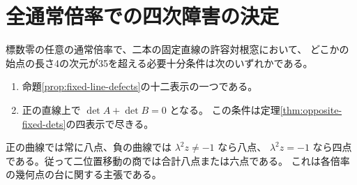 \section{全通常倍率での四次障害の決定}
\label{sec:uniform-fixed-quartic}
\begin{theorem}\label{thm:uniform-fixed-quartic}
標数零の任意の通常倍率で、二本の固定直線の許容対根窓において、
どこかの始点の長さ4の次元が35を超える必要十分条件は次のいずれかである。
\begin{enumerate}
\item 命題\ref{prop:fixed-line-defects}の十二表示の一つである。
\item 正の直線上で $\det A+\det B=0$ となる。
この条件は定理\ref{thm:opposite-fixed-dets}の四表示で尽きる。
\end{enumerate}
正の曲線では常に八点、負の曲線では $\lambda^2z\ne-1$ なら八点、
$\lambda^2z=-1$ なら四点である。従って二位置移動の商では合計八点または六点である。
これは各倍率の幾何点の台に関する主張である。
\end{theorem}
